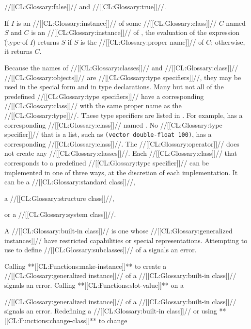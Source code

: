 //[[CL:Glossary:false]]// and //[[CL:Glossary:true]]//.

If  $I$ is an //[[CL:Glossary:instance]]// of some //[[CL:Glossary:class]]// $C$ named $S$  and $C$ is an //[[CL:Glossary:instance]]// of ,  the evaluation of the expression \f{(type-of $I$\/)} returns $S$  if $S$ is the //[[CL:Glossary:proper name]]// of $C$;  otherwise, it returns $C$.

Because the names of //[[CL:Glossary:classes]]//  and //[[CL:Glossary:class]]// //[[CL:Glossary:objects]]// are //[[CL:Glossary:type specifiers]]//, they may be used in the special form  and in type declarations.
                                    Many but not all of the predefined //[[CL:Glossary:type specifiers]]// have a corresponding //[[CL:Glossary:class]]// with  the same proper name as the //[[CL:Glossary:type]]//.  These type specifiers are listed in \figref\ClassTypeCorrespondence. For example,  has  a corresponding //[[CL:Glossary:class]]// named .   No //[[CL:Glossary:type specifier]]// that is a list, such as {\tt (vector double-float 100)}, has a corresponding //[[CL:Glossary:class]]//. The //[[CL:Glossary:operator]]//  does not create any //[[CL:Glossary:classes]]//.
                                             Each //[[CL:Glossary:class]]// that corresponds to a predefined //[[CL:Glossary:type specifier]]// can be implemented in one of three ways, at the discretion of each implementation. It can be a //[[CL:Glossary:standard class]]//,

a //[[CL:Glossary:structure class]]//,


or a //[[CL:Glossary:system class]]//.

A //[[CL:Glossary:built-in class]]// is one whose //[[CL:Glossary:generalized instances]]// have restricted capabilities  or special representations.  Attempting to use  to define  //[[CL:Glossary:subclasses]]// of a  signals an error.

Calling **[[CL:Functions:make-instance]]** to create a //[[CL:Glossary:generalized instance]]// of a  //[[CL:Glossary:built-in class]]// signals an error.  Calling **[[CL:Functions:slot-value]]** on a

//[[CL:Glossary:generalized instance]]// of a //[[CL:Glossary:built-in class]]// signals an error. Redefining a //[[CL:Glossary:built-in class]]// or using **[[CL:Functions:change-class]]** to change

